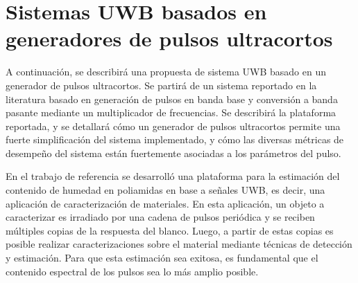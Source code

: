\section{Sistemas UWB basados en generadores de pulsos ultracortos}

A continuación, se describirá una propuesta de sistema UWB basado en un
generador de pulsos ultracortos. Se partirá de un sistema reportado en la
literatura \cite{Altieri2021} basado en generación de pulsos en banda base y
conversión a banda pasante mediante un multiplicador de frecuencias. Se
describirá la plataforma reportada, y se detallará cómo un generador de pulsos
ultracortos permite una fuerte simplificación del sistema implementado, y cómo
las diversas métricas de desempeño del sistema están fuertemente asociadas a los
parámetros del pulso.

En el trabajo de referencia \cite{Altieri2021} se desarrolló una plataforma para
la estimación del contenido de humedad en poliamidas en base a señales UWB, es
decir, una aplicación de caracterización de materiales. En esta aplicación, un
objeto a caracterizar es irradiado por una cadena de pulsos periódica y se
reciben múltiples copias de la respuesta del blanco. Luego, a partir de estas
copias es posible realizar caracterizaciones sobre el material mediante técnicas
de detección y estimación.  Para que esta estimación sea exitosa, es fundamental
que el contenido espectral de los pulsos sea lo más amplio posible.

